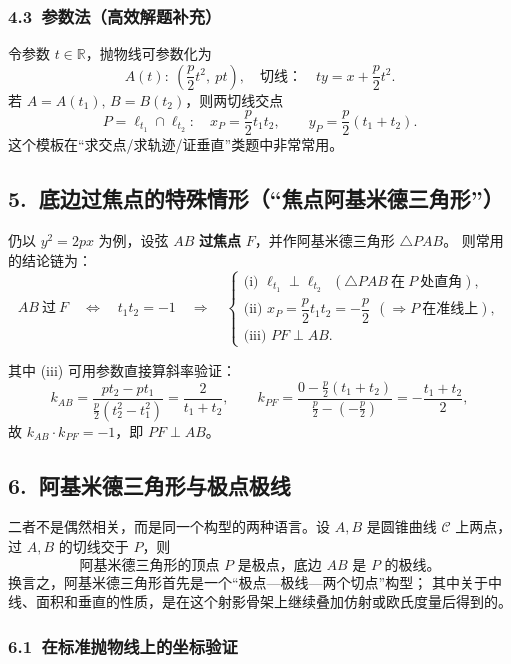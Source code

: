 \documentclass{ctexart}
\begin{document}
	\subsubsection*{4.3\ 参数法（高效解题补充）}
	令参数 $t\in\mathbb R$，抛物线可参数化为
	\[
	A(t):\ \left(\frac p2 t^2,\ pt\right),
	\quad\text{切线：}\quad
	ty=x+\frac p2 t^2.
	\]
	若 $A=A(t_1),\,B=B(t_2)$，则两切线交点
	\[
	P=\ell_{t_1}\cap \ell_{t_2}:
	\quad
	x_P=\frac p2 t_1t_2,\qquad
	y_P=\frac p2 (t_1+t_2).
	\]
	这个模板在“求交点/求轨迹/证垂直”类题中非常常用。
	
	\subsection*{5.\ 底边过焦点的特殊情形（“焦点阿基米德三角形”）}
	仍以 $y^2=2px$ 为例，设弦 $AB$ \textbf{过焦点} $F$，并作阿基米德三角形 $\triangle PAB$。
	则常用的结论链为：
	\[
	AB\ \text{过}\ F
	\quad\Longleftrightarrow\quad
	t_1t_2=-1
	\quad\Longrightarrow\quad
	\begin{cases}
		\text{(i) } \ell_{t_1}\perp \ell_{t_2}\ \ (\triangle PAB\ \text{在}\ P\ \text{处直角}),\\[2pt]
		\text{(ii) } x_P=\dfrac p2 t_1t_2=-\dfrac p2\ \ (\Rightarrow P\ \text{在准线上}),\\[2pt]
		\text{(iii) } PF\perp AB.
	\end{cases}
	\]
	
	其中 (iii) 可用参数直接算斜率验证：
	\[
	k_{AB}=\frac{pt_2-pt_1}{\frac p2(t_2^2-t_1^2)}=\frac{2}{t_1+t_2},\qquad
	k_{PF}=\frac{0-\frac p2(t_1+t_2)}{\frac p2-(-\frac p2)}=-\frac{t_1+t_2}{2},
	\]
	故 $k_{AB}\cdot k_{PF}=-1$，即 $PF\perp AB$。
	
	\subsection*{6.\ 阿基米德三角形与极点极线}

	二者不是偶然相关，而是同一个构型的两种语言。设 $A,B$ 是圆锥曲线
	$\mathcal C$ 上两点，过 $A,B$ 的切线交于 $P$，则
	\[
	\boxed{\text{阿基米德三角形的顶点 }P
	\text{ 是极点，底边 }AB\text{ 是 }P\text{ 的极线。}}
	\]
	换言之，阿基米德三角形首先是一个``极点---极线---两个切点''构型；
	其中关于中线、面积和垂直的性质，是在这个射影骨架上继续叠加仿射或欧氏度量后得到的。

	\subsubsection*{6.1\ 在标准抛物线上的坐标验证}
\end{document}
